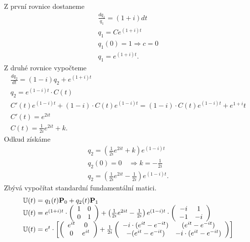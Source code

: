 Z první rovnice dostaneme
\begin{equation*}
 \begin{array}{l} \frac{dq_1}{q_1} = (1 + i)dt \\ q_1 = C e^{(1 + i)t} \\ q_1(0) = 1 \Rightarrow c = 0 \\ q_1 = e^{(1 + i)t}.\end{array}
\end{equation*}
Z druhé rovnice vypočteme
\begin{equation*}
 \begin{array}{l} \frac{dq_2}{dt} = (1 - i)q_2 + e^{(1 + i)t} \\ q_2 = e^{(1 - i)t} \cdot C(t) \\ C'(t)e^{(1 - i)t} + (1 - i)\cdot C(t)e^{(1 - i)t} = (1 - i)\cdot C(t)e^{(1 - i)t} + e^{1 + i}t \\ C'(t) = e^{2it}\\ C(t) = \frac{1}{2i}e^{2it} + k.\end{array}
\end{equation*}
Odkud získáme
\begin{equation*}
 \begin{array}{l}
  q_2 = \left( \frac{1}{2i}e^{2it} + k \right)e^{(1-i)t}\\
  q_2(0) = 0\quad \Rightarrow k = -\frac{1}{2i}\\
  q_2 = \left( \frac{1}{2i}e^{2it} -\frac{1}{2i} \right)e^{(1-i)t}.
 \end{array}
\end{equation*}
Zbývá vypočítat standardní fundamentální matici.
\begin{equation*}
 \begin{array}{l}{{\mathbb{U}}}(t) = q_1(t){\bf P}_0 + q_2(t){\bf P}_1\\
  {{\mathbb{U}}}(t) =  e^{(1 + i)t} \cdot \left(\begin{array}{cc} 1 & 0 \\ 0 & 1 \end{array}\right) + \left( \frac{1}{2i}e^{2it} -\frac{1}{2i} \right)e^{(1-i)t} \cdot \left( \begin{array}{cc} -i & 1\\ -1 & -i\end{array}\right)\\
  {{\mathbb{U}}}(t) =  e^t\cdot\left[\left(\begin{array}{cc} e^{it} & 0 \\ 0 & e^{it} \end{array}\right) + \frac{1}{2i}\left( \begin{array}{cc} -i\cdot (e^{it} - e^{-it}) & (e^{it} - e^{-it})\\ -(e^{it} - e^{-it}) & -i\cdot (e^{it} - e^{-it}) \end{array}\right)\right]
  \end{array}
\end{equation*}

